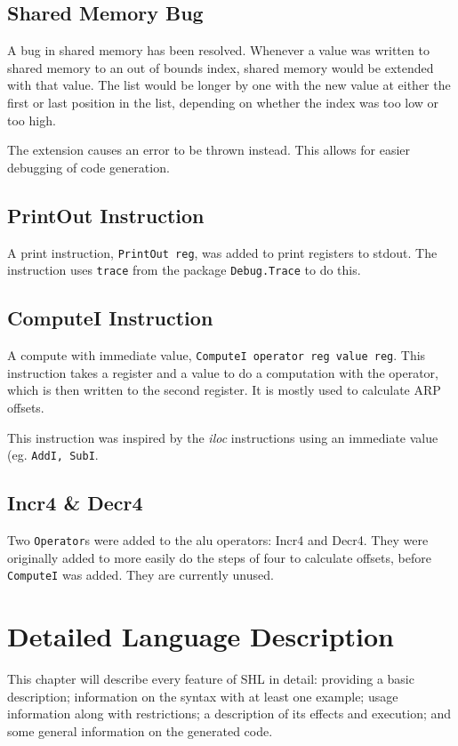 \documentclass[twoside]{report}
\begin{document}
\section{Shared Memory Bug}
\label{shared_memory_bug}
A bug in shared memory has been resolved. Whenever a value was written to shared memory to an out of bounds index, shared memory would be extended with that value. The list would be longer by one with the new value at either the first or last position in the list, depending on whether the index was too low or too high.

The extension causes an error to be thrown instead. This allows for easier debugging of code generation.

\section{PrintOut Instruction}
\label{printout_instruction}
A print instruction, \texttt{PrintOut reg}, was added to print registers to stdout. The instruction uses \texttt{trace} from the package \texttt{Debug.Trace} to do this.

\section{ComputeI Instruction}
\label{computei_instruction}
A compute with immediate value, \texttt{ComputeI operator reg value reg}. This instruction takes a register and a value to do a computation with the operator, which is then written to the second register. It is mostly used to calculate ARP offsets. 

This instruction was inspired by the \emph{iloc} instructions using an immediate value (eg. \texttt{AddI, SubI}.

\section{Incr4 \& Decr4}
\label{incr4_and_decr4}
Two \texttt{Operator}s were added to the alu operators: Incr4 and Decr4. They were originally added to more easily do the steps of four to calculate offsets, before \texttt{ComputeI} was added. They are currently unused.


\chapter{Detailed Language Description}
\label{detailed_language_description}
This chapter will describe every feature of SHL in detail: providing a basic description; information on the syntax with at least one example; usage information along with restrictions; a description of its effects and execution; and some general information on the generated code.
\end{document}

